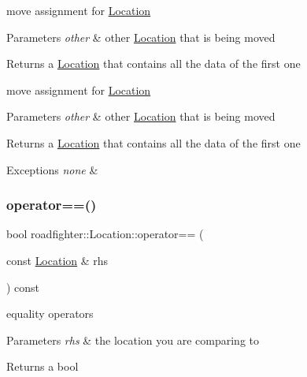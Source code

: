 move assignment for \hyperlink{classroadfighter_1_1Location}{Location} 
\begin{DoxyParams}{Parameters}
{\em other} & other \hyperlink{classroadfighter_1_1Location}{Location} that is being moved \\
\hline
\end{DoxyParams}
\begin{DoxyReturn}{Returns}
a \hyperlink{classroadfighter_1_1Location}{Location} that contains all the data of the first one
\end{DoxyReturn}
move assignment for \hyperlink{classroadfighter_1_1Location}{Location} 
\begin{DoxyParams}{Parameters}
{\em other} & other \hyperlink{classroadfighter_1_1Location}{Location} that is being moved \\
\hline
\end{DoxyParams}
\begin{DoxyReturn}{Returns}
a \hyperlink{classroadfighter_1_1Location}{Location} that contains all the data of the first one 
\end{DoxyReturn}

\begin{DoxyExceptions}{Exceptions}
{\em none} & \\
\hline
\end{DoxyExceptions}
\mbox{\label{classroadfighter_1_1Location_a41950b871d6b83269c063e9d34bbc24c}} 
\subsubsection{\texorpdfstring{operator==()}{operator==()}}
{\footnotesize\ttfamily bool roadfighter\+::\+Location\+::operator== (\begin{DoxyParamCaption}\item[{const \hyperlink{classroadfighter_1_1Location}{Location} \&}]{rhs }\end{DoxyParamCaption}) const}

equality operators 
\begin{DoxyParams}{Parameters}
{\em rhs} & the location you are comparing to \\
\hline
\end{DoxyParams}
\begin{DoxyReturn}{Returns}
a bool 
\end{DoxyReturn}
\mbox{\label{classroadfighter_1_1Location_ac58576927a3841e2ac0f3a14238be14f}} 
